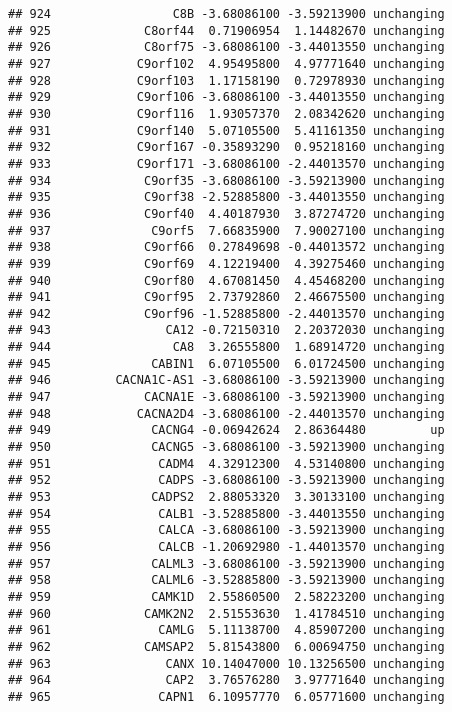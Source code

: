 \documentclass[]{article}
\begin{document}
\begin{verbatim}
## 924                 C8B -3.68086100 -3.59213900 unchanging
## 925             C8orf44  0.71906954  1.14482670 unchanging
## 926             C8orf75 -3.68086100 -3.44013550 unchanging
## 927            C9orf102  4.95495800  4.97771640 unchanging
## 928            C9orf103  1.17158190  0.72978930 unchanging
## 929            C9orf106 -3.68086100 -3.44013550 unchanging
## 930            C9orf116  1.93057370  2.08342620 unchanging
## 931            C9orf140  5.07105500  5.41161350 unchanging
## 932            C9orf167 -0.35893290  0.95218160 unchanging
## 933            C9orf171 -3.68086100 -2.44013570 unchanging
## 934             C9orf35 -3.68086100 -3.59213900 unchanging
## 935             C9orf38 -2.52885800 -3.44013550 unchanging
## 936             C9orf40  4.40187930  3.87274720 unchanging
## 937              C9orf5  7.66835900  7.90027100 unchanging
## 938             C9orf66  0.27849698 -0.44013572 unchanging
## 939             C9orf69  4.12219400  4.39275460 unchanging
## 940             C9orf80  4.67081450  4.45468200 unchanging
## 941             C9orf95  2.73792860  2.46675500 unchanging
## 942             C9orf96 -1.52885800 -2.44013570 unchanging
## 943                CA12 -0.72150310  2.20372030 unchanging
## 944                 CA8  3.26555800  1.68914720 unchanging
## 945              CABIN1  6.07105500  6.01724500 unchanging
## 946         CACNA1C-AS1 -3.68086100 -3.59213900 unchanging
## 947             CACNA1E -3.68086100 -3.59213900 unchanging
## 948            CACNA2D4 -3.68086100 -2.44013570 unchanging
## 949              CACNG4 -0.06942624  2.86364480         up
## 950              CACNG5 -3.68086100 -3.59213900 unchanging
## 951               CADM4  4.32912300  4.53140800 unchanging
## 952               CADPS -3.68086100 -3.59213900 unchanging
## 953              CADPS2  2.88053320  3.30133100 unchanging
## 954               CALB1 -3.52885800 -3.44013550 unchanging
## 955               CALCA -3.68086100 -3.59213900 unchanging
## 956               CALCB -1.20692980 -1.44013570 unchanging
## 957              CALML3 -3.68086100 -3.59213900 unchanging
## 958              CALML6 -3.52885800 -3.59213900 unchanging
## 959              CAMK1D  2.55860500  2.58223200 unchanging
## 960             CAMK2N2  2.51553630  1.41784510 unchanging
## 961               CAMLG  5.11138700  4.85907200 unchanging
## 962             CAMSAP2  5.81543800  6.00694750 unchanging
## 963                CANX 10.14047000 10.13256500 unchanging
## 964                CAP2  3.76576280  3.97771640 unchanging
## 965               CAPN1  6.10957770  6.05771600 unchanging

\end{verbatim}
\end{document}
